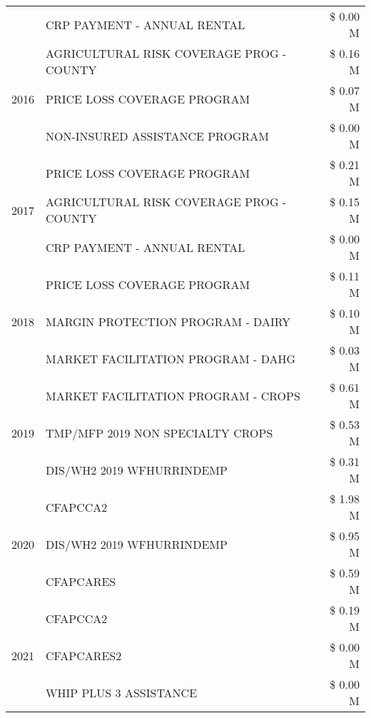 \begin{tabular}{llr}
 & CRP PAYMENT - ANNUAL RENTAL & \$ 0.00 M \\
\cline{1-3}
\multirow[t]{3}{*}{2016} & AGRICULTURAL RISK COVERAGE PROG - COUNTY & \$ 0.16 M \\
 & PRICE LOSS COVERAGE PROGRAM & \$ 0.07 M \\
 & NON-INSURED ASSISTANCE PROGRAM & \$ 0.00 M \\
\cline{1-3}
\multirow[t]{3}{*}{2017} & PRICE LOSS COVERAGE PROGRAM & \$ 0.21 M \\
 & AGRICULTURAL RISK COVERAGE PROG - COUNTY & \$ 0.15 M \\
 & CRP PAYMENT - ANNUAL RENTAL & \$ 0.00 M \\
\cline{1-3}
\multirow[t]{3}{*}{2018} & PRICE LOSS COVERAGE PROGRAM & \$ 0.11 M \\
 & MARGIN PROTECTION PROGRAM - DAIRY & \$ 0.10 M \\
 & MARKET FACILITATION PROGRAM - DAHG & \$ 0.03 M \\
\cline{1-3}
\multirow[t]{3}{*}{2019} & MARKET FACILITATION PROGRAM - CROPS & \$ 0.61 M \\
 & TMP/MFP 2019 NON SPECIALTY CROPS & \$ 0.53 M \\
 & DIS/WH2 2019 WFHURRINDEMP & \$ 0.31 M \\
\cline{1-3}
\multirow[t]{3}{*}{2020} & CFAPCCA2 & \$ 1.98 M \\
 & DIS/WH2 2019 WFHURRINDEMP & \$ 0.95 M \\
 & CFAPCARES & \$ 0.59 M \\
\cline{1-3}
\multirow[t]{3}{*}{2021} & CFAPCCA2 & \$ 0.19 M \\
 & CFAPCARES2 & \$ 0.00 M \\
 & WHIP PLUS 3 ASSISTANCE & \$ 0.00 M \\
\cline{1-3}
\bottomrule
\end{tabular}
